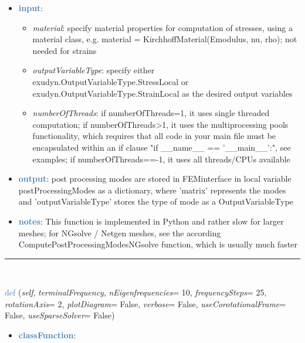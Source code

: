 \begin{itemize}[leftmargin=1.4cm]
\begin{itemize}[leftmargin=1.4cm]
\begin{itemize}[leftmargin=1.4cm]
\begin{itemize}[leftmargin=0.5cm]
\begin{itemize}[leftmargin=1.4cm]
\begin{itemize}[leftmargin=1.4cm]
\begin{itemize}[leftmargin=1.4cm]
\begin{itemize}[leftmargin=0.5cm]
\begin{itemize}[leftmargin=0.7cm]
\item[--]\textcolor{steelblue}{\bf input}: \vspace{-6pt}
\begin{itemize}[leftmargin=1.2cm]
\setlength{\itemindent}{-0.7cm}
\item[]{\it material}: specify material properties for computation of stresses, using a material class, e.g. material = KirchhoffMaterial(Emodulus, nu, rho); not needed for strains
\item[]{\it outputVariableType}: specify either exudyn.OutputVariableType.StressLocal or exudyn.OutputVariableType.StrainLocal as the desired output variables
\item[]{\it numberOfThreads}: if numberOfThreads=1, it uses single threaded computation; if numberOfThreads>1, it uses the multiprocessing pools functionality, which requires that all code in your main file must be encapsulated within an if clause "if \_\_name\_\_ == '\_\_main\_\_':", see examples; if numberOfThreads==-1, it uses all threads/CPUs available
\end{itemize}
\item[--]\textcolor{steelblue}{\bf output}: post processing modes are stored in FEMinterface in local variable postProcessingModes as a dictionary, where 'matrix' represents the modes and 'outputVariableType' stores the type of mode as a OutputVariableType
\item[--]\textcolor{steelblue}{\bf notes}: This function is implemented in Python and rather slow for larger meshes; for NGsolve / Netgen meshes, see the according ComputePostProcessingModesNGsolve function, which is usually much faster
\vspace{12pt}\end{itemize}
%
\noindent\rule{8cm}{0.75pt}\vspace{1pt} \\ 
\begin{flushleft}
\noindent \textcolor{steelblue}{def {\bf {}}}\label{sec:FEM:FEMinterface:ComputeCampbellDiagram}
({\it self}, {\it terminalFrequency}, {\it nEigenfrequencies}= 10, {\it frequencySteps}= 25, {\it rotationAxis}= 2, {\it plotDiagram}= False, {\it verbose}= False, {\it useCorotationalFrame}= False, {\it useSparseSolver}= False)
\end{flushleft}
\setlength{\itemindent}{0.7cm}
\begin{itemize}[leftmargin=0.7cm]
\item[--]\textcolor{steelblue}{\bf classFunction}: \vspace{-6pt}

\end{itemize}
\end{itemize}
\end{itemize}
\end{itemize}
\end{itemize}
\end{itemize}
\end{itemize}
\end{itemize}
\end{itemize}
